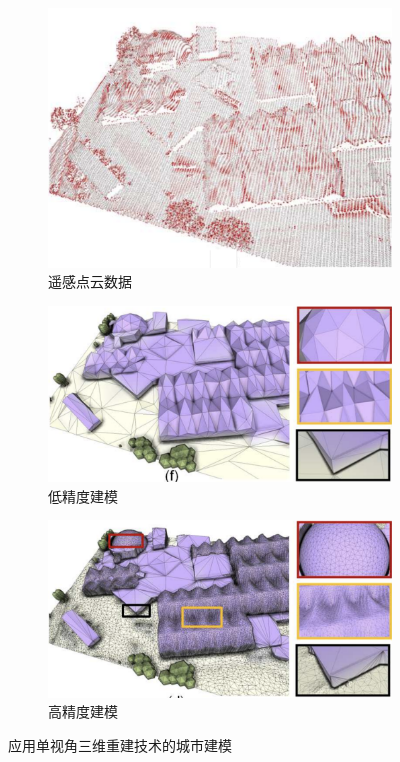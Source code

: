 \documentclass[bachelor, nocolorlinks, printoneside]{seuthesis} %
\begin{document}
\begin{Main}
\begin{figure}
\begin{subfigure}[t]{0.30\linewidth}
        \includegraphics[width=\columnwidth]{figs/app/remotesense.png}
        \caption{遥感点云数据}\label{fig:civil-remotesense}
    \end{subfigure}
    \begin{subfigure}[t]{0.45\linewidth} \centering
        \includegraphics[width=\columnwidth]{figs/app/coarse_modeling.png}
        \caption{低精度建模}\label{fig:civil-coarse} 
    \end{subfigure}
    \hspace{0.1\linewidth}
    \begin{subfigure}[t]{0.45\linewidth} \centering
        \includegraphics[width=\columnwidth]{figs/app/high_modeling.png}
        \caption{高精度建模}\label{fig:civil-high} 
    \end{subfigure}
  \caption{\small 应用单视角三维重建技术的城市建模 }\label{fig:civil-modeling}
\end{figure}


\end{Main}
\end{document}
